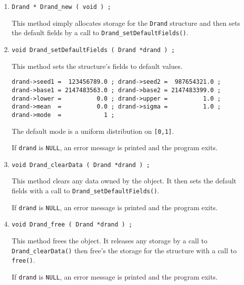 \begin{enumerate}
\item
\begin{verbatim}
Drand * Drand_new ( void ) ;
\end{verbatim}
This method simply allocates storage for the {\tt Drand} structure 
and then sets the default fields by a call to 
{\tt Drand\_setDefaultFields()}.
\item
\begin{verbatim}
void Drand_setDefaultFields ( Drand *drand ) ;
\end{verbatim}
This method sets the structure's fields to default values.
\begin{center}
\begin{verbatim}
drand->seed1 =  123456789.0 ; drand->seed2 =  987654321.0 ;
drand->base1 = 2147483563.0 ; drand->base2 = 2147483399.0 ;
drand->lower =          0.0 ; drand->upper =          1.0 ;
drand->mean  =          0.0 ; drand->sigma =          1.0 ;
drand->mode  =            1 ;
\end{verbatim}
\end{center}
The default mode is a uniform distribution on {\tt [0,1]}.
\par {}
If {\tt drand} is {\tt NULL},
an error message is printed and the program exits.
\item
\begin{verbatim}
void Drand_clearData ( Drand *drand ) ;
\end{verbatim}
This method clears any data owned by the object.
It then sets the default fields 
with a call to {\tt Drand\_setDefaultFields()}.
\par {}
If {\tt drand} is {\tt NULL},
an error message is printed and the program exits.
\item
\begin{verbatim}
void Drand_free ( Drand *drand ) ;
\end{verbatim}
This method frees the object.
It releases any storage by a call to 
{\tt Drand\_clearData()} then free's the storage for the 
structure with a call to {\tt free()}.
\par {}
If {\tt drand} is {\tt NULL},
an error message is printed and the program exits.
\end{enumerate}
\par
